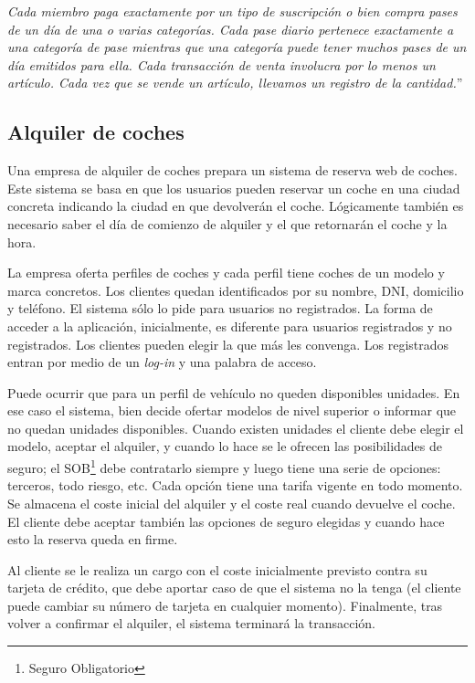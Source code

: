 \documentclass{db-practice}
\begin{document}
\textit{Cada miembro paga exactamente por un tipo de suscripción o bien compra pases de un día de una o varias categorías. Cada pase diario pertenece exactamente a una categoría de pase mientras que una categoría puede tener muchos pases de un día emitidos para ella. Cada transacción de venta involucra por lo menos un artículo. Cada vez que se vende un artículo, llevamos un registro de la cantidad.}''

\subsection{Alquiler de coches}
Una empresa de alquiler de coches prepara un sistema de reserva web de coches. Este sistema se basa en que los usuarios pueden reservar un coche en una ciudad concreta indicando la ciudad en que devolverán el coche. Lógicamente también es necesario saber el día de comienzo de alquiler y el que retornarán el coche y la hora. 

La empresa oferta perfiles de coches y cada perfil tiene coches de un modelo y marca concretos. Los clientes quedan identificados por su nombre, DNI, domicilio y teléfono. El sistema sólo lo pide para usuarios no registrados. La forma de acceder a la aplicación, inicialmente, es diferente para usuarios registrados y no registrados. Los clientes pueden elegir la que más les convenga. Los registrados entran por medio de un \textit{log-in} y una palabra de acceso.

Puede ocurrir que para un perfil de vehículo no queden disponibles unidades. En ese caso el sistema, bien decide ofertar modelos de nivel superior o informar que no quedan unidades disponibles. Cuando existen unidades el cliente debe elegir el modelo, aceptar el alquiler, y cuando lo hace se le ofrecen las posibilidades de seguro; el SOB\footnote{Seguro Obligatorio} debe contratarlo siempre y luego tiene una serie de opciones: terceros, todo riesgo, etc. Cada opción tiene una tarifa vigente en todo momento. Se almacena el coste inicial del alquiler y el coste real cuando devuelve el coche. El cliente debe aceptar también las opciones de seguro elegidas y cuando hace esto la reserva queda en firme. 

Al cliente se le realiza un cargo con el coste inicialmente previsto contra su tarjeta de crédito, que debe aportar caso de que el sistema no la tenga (el cliente puede cambiar su número de tarjeta en cualquier momento). Finalmente, tras volver a confirmar el alquiler, el sistema terminará la transacción.
\end{document}

